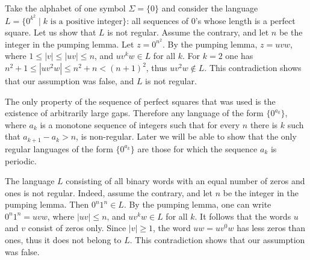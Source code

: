 \begin{page}
\setcounter{section}{3}
\setcounter{subsection}{2}
\setcounter{dfn}{5}
\label{portion:1001}

\begin{exl}
Take the alphabet of one symbol $\Sigma = \{0\}$
and consider the language $L = \{0^{k^2} \mid k \text{ is a positive integer}\}$:
all sequences of $0$'s whose length is a perfect square.
Let us show that $L$ is not regular. Assume the contrary, and let $n$ be the integer in the pumping lemma.
Let $z = 0^{n^2}$. By the pumping lemma, $z = uvw$, where $1 \le |v| \le |uv| \le n$, and $uv^kw \in L$ for all $k$.
For $k=2$ one has $n^2+1 \le |uv^2w| \le n^2 + n < (n+1)^2$, thus $uv^2w \notin L$.
This contradiction shows that our assumption was false, and $L$ is not regular.
\end{exl}

\end{page}

\begin{page}
\setcounter{section}{3}
\setcounter{subsection}{2}
\setcounter{dfn}{5}
\label{portion:1002}


The only property of the sequence of perfect squares that was used is the existence of arbitrarily large gaps.
Therefore any language of the form $\{0^{a_k}\}$,
where $a_k$ is a monotone sequence of integers such that for every $n$ there is $k$ such that $a_{k+1} - a_k > n$, is non-regular.
Later we will be able to show that the only regular languages of the form $\{0^{a_k}\}$ are those for which the sequence $a_k$ is periodic.


\end{page}

\begin{page}
\setcounter{section}{3}
\setcounter{subsection}{2}
\setcounter{dfn}{6}
\label{portion:1004}

\begin{exl}
The language $L$ consisting of all binary words with an equal number of zeros and ones is not regular.
Indeed, assume the contrary, and let $n$ be the integer in the pumping lemma.
Then $0^n1^n \in L$.
By the pumping lemma, one can write $0^n1^n = uvw$, where $|uv| \le n$, and $uv^kw \in L$ for all $k$.
It follows that the words $u$ and $v$ consist of zeros only.
Since $|v| \ge 1$, the word $uw = uv^0w$ has less zeros than ones, thus it does not belong to $L$.
This contradiction shows that our assumption was false.
\end{exl}

\end{page}

